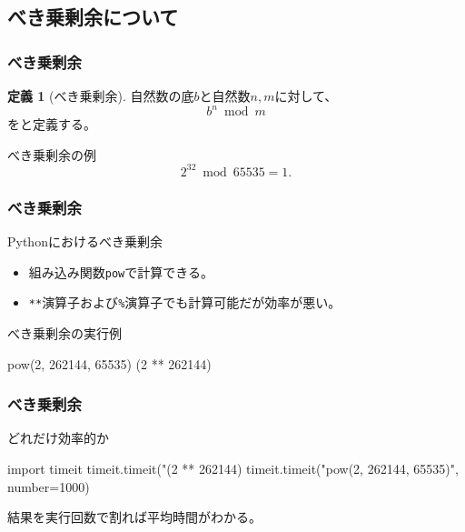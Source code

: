\documentclass[aspectratio=169,dvipdfmx,14pt,notheorems]{beamer}
\theoremstyle{definition}
\newtheorem{definition}{定義}
\begin{document}
\subsection{べき乗剰余について}

\begin{frame}\frametitle{べき乗剰余}
\begin{definition}[べき乗剰余]
自然数の底$b$と自然数$n, m$に対して、
\begin{equation*}
b^{n} \bmod{m}
\end{equation*}
をと定義する。
\end{definition}

\begin{exampleblock}{べき乗剰余の例}
\begin{equation*}
2^{32} \bmod{65535} = 1.
\end{equation*}
\end{exampleblock}

\end{frame}

\begin{frame}[fragile]\frametitle{べき乗剰余}

\begin{block}{Pythonにおけるべき乗剰余}
\begin{itemize}
\item 組み込み関数\texttt{pow}で計算できる。
\item \texttt{**}演算子および\texttt{\%}演算子でも計算可能だが\alert{効率が悪い}。
\end{itemize}
\end{block}

\begin{exampleblock}{べき乗剰余の実行例}

\begin{pyconsole}
pow(2, 262144, 65535)
(2 ** 262144) %
\end{pyconsole}

\end{exampleblock}

\end{frame}

\begin{frame}[fragile]\frametitle{べき乗剰余}

\begin{exampleblock}{どれだけ効率的か}

\begin{pyconsole}
import timeit
timeit.timeit("(2 ** 262144) %
timeit.timeit("pow(2, 262144, 65535)", number=1000)
\end{pyconsole}

\end{exampleblock}
結果を実行回数で割れば平均時間がわかる。

\end{frame}
\end{document}
